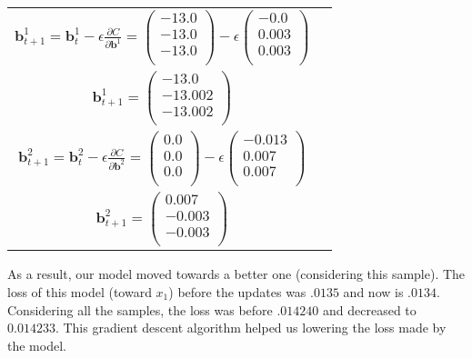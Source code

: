 \begin{tabular}{cc}
				\hline
				$ \boldsymbol{b}^1_{t+1} = \boldsymbol{b}^1_t - \epsilon \frac{\partial C}{\partial \boldsymbol{b}^1} = 
					\left( \begin{matrix}
					-13.0 \\
					-13.0 \\
					-13.0 \\
					\end{matrix} \right) - \epsilon 
					\left( \begin{matrix}
					-0.0 \\
					0.003 \\
					0.003 \\
					\end{matrix} \right)$ \\
				$ \boldsymbol{b}^1_{t+1} = 
					\left( \begin{matrix}
					-13.0 \\
					-13.002 \\
					-13.002 \\
					\end{matrix} \right)$ \\

				\hline
 				$ \boldsymbol{b}^2_{t+1} = \boldsymbol{b}^2_t - \epsilon \frac{\partial C}{\partial \boldsymbol{b}^2} = 
					\left( \begin{matrix}
					0.0 \\
					0.0 \\
					0.0 \\
					\end{matrix} \right) - \epsilon 
					\left( \begin{matrix}
					-0.013 \\
					0.007 \\
					0.007 \\
					\end{matrix} \right)$ \\
				$ \boldsymbol{b}^2_{t+1} = 
					\left( \begin{matrix}
					0.007 \\
					-0.003 \\
					-0.003 \\
					\end{matrix} \right)$ \\
			\end{tabular}

			As a result, our model moved towards a better one (considering this sample). The loss of this model (toward $x_1$) before the updates was $.0135$ and now is $.0134$. Considering all the samples, the loss was before $.014240$ and decreased to $0.014233$. This gradient descent algorithm helped us lowering the loss made by the model.
